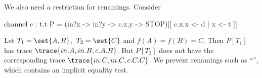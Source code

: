 




We also need a restriction for renamings.  Consider
%
\begin{cspm}
channel c : t.t
P = (in?x -> in?y -> c.x.y -> STOP)[[ c.x.x <- d | x <- t ]]
\end{cspm}
%
Let $T_1 = \set{A,B}$,\, $T_2 = \set{C}$ and $f(A) = f(B) = C$.  Then $P[T_1]$
has trace $\trace{in.A, in.B, c.A.B}$.  But $P[T_2]$ does not have the
corresponding trace $\trace{in.C, in.C, c.C.C}$.  We prevent renamings such as
``'', which contains an implicit equality test. 




